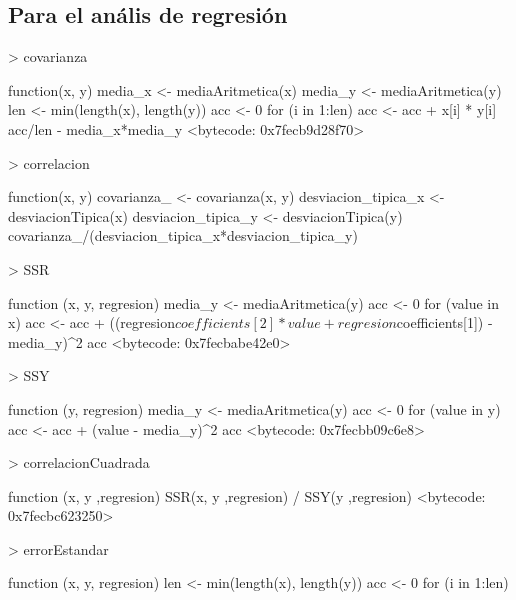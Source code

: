 \documentclass [a4paper] {article}
\begin{document}
\subsection{Para el anális de regresión}
\begin{Schunk}
\begin{Sinput}
> covarianza
\end{Sinput}
\begin{Soutput}
function(x, y) {
  media_x <- mediaAritmetica(x)
  media_y <- mediaAritmetica(y)
  len <- min(length(x), length(y))
  acc <- 0
  for (i in 1:len) {
    acc <- acc + x[i] * y[i]
  }
  acc/len - media_x*media_y
}
<bytecode: 0x7fecb9d28f70>
\end{Soutput}
\begin{Sinput}
> correlacion
\end{Sinput}
\begin{Soutput}
function(x, y) {
  covarianza_ <- covarianza(x, y)
  desviacion_tipica_x <- desviacionTipica(x)
  desviacion_tipica_y <- desviacionTipica(y)
  covarianza_/(desviacion_tipica_x*desviacion_tipica_y)
}
\end{Soutput}
\begin{Sinput}
> SSR
\end{Sinput}
\begin{Soutput}
function (x, y, regresion){
  media_y <- mediaAritmetica(y)
  acc <- 0
  for (value in x){
    acc <- acc + ((regresion$coefficients[2]*value+regresion$coefficients[1]) - media_y)^2
  }
  acc
}
<bytecode: 0x7fecbabe42e0>
\end{Soutput}
\begin{Sinput}
> SSY
\end{Sinput}
\begin{Soutput}
function (y, regresion){
  media_y <- mediaAritmetica(y)
  acc <- 0
  for (value in y){
    acc <- acc + (value - media_y)^2
  }
  acc
}
<bytecode: 0x7fecbb09c6e8>
\end{Soutput}
\begin{Sinput}
> correlacionCuadrada
\end{Sinput}
\begin{Soutput}
function (x, y ,regresion){
  SSR(x, y ,regresion) / SSY(y ,regresion)
}
<bytecode: 0x7fecbc623250>
\end{Soutput}
\begin{Sinput}
> errorEstandar
\end{Sinput}
\begin{Soutput}
function (x, y, regresion) {
  len <- min(length(x), length(y))
  acc <- 0
  for (i in 1:len){
}}
\end{Soutput}
\end{Schunk}
\end{document}
